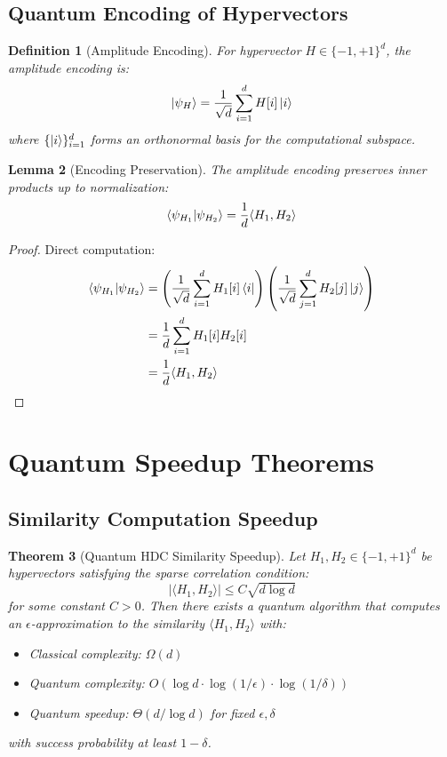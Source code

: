 \documentclass[11pt]{article}
\newtheorem{theorem}{Theorem}[section]
\newtheorem{lemma}[theorem]{Lemma}
\newtheorem{definition}[theorem]{Definition}
\begin{document}
\subsection{Quantum Encoding of Hypervectors}

\begin{definition}[Amplitude Encoding]
For hypervector $H \in \{-1, +1\}^d$, the amplitude encoding is:
$$\ket{\psi_H} = \frac{1}{\sqrt{d}} \sum_{i=1}^{d} H[i] \ket{i}$$
where $\{\ket{i}\}_{i=1}^d$ forms an orthonormal basis for the computational subspace.
\end{definition}

\begin{lemma}[Encoding Preservation]
The amplitude encoding preserves inner products up to normalization:
$$\braket{\psi_{H_1}}{\psi_{H_2}} = \frac{1}{d} \langle H_1, H_2 \rangle$$
\end{lemma}

\begin{proof}
Direct computation:
\begin{align}
\braket{\psi_{H_1}}{\psi_{H_2}} &= \left(\frac{1}{\sqrt{d}} \sum_{i=1}^{d} H_1[i] \bra{i}\right) \left(\frac{1}{\sqrt{d}} \sum_{j=1}^{d} H_2[j] \ket{j}\right) \\
&= \frac{1}{d} \sum_{i=1}^{d} H_1[i] H_2[i] \\
&= \frac{1}{d} \langle H_1, H_2 \rangle
\end{align}
\end{proof}

\section{Quantum Speedup Theorems}

\subsection{Similarity Computation Speedup}

\begin{theorem}[Quantum HDC Similarity Speedup]
\label{thm:similarity_detailed}
Let $H_1, H_2 \in \{-1, +1\}^d$ be hypervectors satisfying the sparse correlation condition:
$$|\langle H_1, H_2 \rangle| \leq C\sqrt{d \log d}$$
for some constant $C > 0$. Then there exists a quantum algorithm that computes an $\epsilon$-approximation to the similarity $\langle H_1, H_2 \rangle$ with:
\begin{itemize}
\item Classical complexity: $\Omega(d)$
\item Quantum complexity: $O(\log d \cdot \log(1/\epsilon) \cdot \log(1/\delta))$
\item Quantum speedup: $\Theta(d/\log d)$ for fixed $\epsilon, \delta$
\end{itemize}
with success probability at least $1-\delta$.
\end{theorem}
\end{document}
